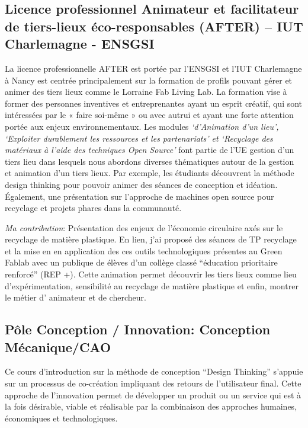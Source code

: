 \documentclass[
  11pt,
]{article}
\begin{document}
\hypertarget{licence-professionnel-animateur-et-facilitateur-de-tiers-lieux-uxe9co-responsables-after-iut-charlemagne---ensgsi}{%
\subsection{Licence professionnel Animateur et facilitateur de
tiers-lieux éco-responsables (AFTER) -- IUT Charlemagne -
ENSGSI}\label{licence-professionnel-animateur-et-facilitateur-de-tiers-lieux-uxe9co-responsables-after-iut-charlemagne---ensgsi}}

La licence professionnelle AFTER est portée par l'ENSGSI et l'IUT
Charlemagne à Nancy est centrée principalement sur la formation de
profils pouvant gérer et animer des tiers lieux comme le Lorraine Fab
Living Lab. La formation vise à former des personnes inventives et
entreprenantes ayant un esprit créatif, qui sont intéressées par le «
faire soi-même » ou avec autrui et ayant une forte attention portée aux
enjeux environnementaux. Les modules \emph{`d'Animation d'un lieu',
`Exploiter durablement les ressources et les partenariats' et `Recyclage
des matériaux à l'aide des techniques Open Source'} font partie de l'UE
gestion d'un tiers lieu dans lesquels nous abordons diverses thématiques
autour de la gestion et animation d'un tiers lieux. Par exemple, les
étudiants découvrent la méthode design thinking pour pouvoir animer des
séances de conception et idéation. Également, une présentation sur
l'approche de machines open source pour recyclage et projets phares dans
la communauté.

\emph{Ma contribution}: Présentation des enjeux de l'économie circulaire
axés sur le recyclage de matière plastique. En lien, j'ai proposé des
séances de TP recyclage et la mise en en application des ces outils
technologiques présentes au Green Fablab avec un publique de élèves d'un
collège classé ``éducation prioritaire renforcé'' (REP +). Cette
animation permet découvrir les tiers lieux comme lieu d'expérimentation,
sensibilité au recyclage de matière plastique et enfin, montrer le
métier d' animateur et de chercheur.

\hypertarget{puxf4le-conception-innovation-conception-muxe9caniquecao}{%
\subsection{Pôle Conception / Innovation: Conception
Mécanique/CAO}\label{puxf4le-conception-innovation-conception-muxe9caniquecao}}

Ce cours d'introduction sur la méthode de conception ``Design Thinking''
s'appuie sur un processus de co-création impliquant des retours de
l'utilisateur final. Cette approche de l'innovation permet de développer
un produit ou un service qui est à la fois désirable, viable et
réalisable par la combinaison des approches humaines, économiques et
technologiques.
\end{document}
